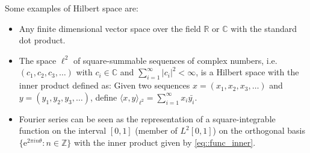 Some examples of Hilbert space are:

\begin{itemize}
  \item Any finite dimensional vector space over the field $\mathbb{R}$ or
  $\mathbb{C}$ with the standard dot product.
  \item The space $\ell^2$ of square-summable sequences of complex numbers, i.e.
  $(c_1,c_2,c_3,\ldots)$ with $c_i \in \mathbb{C}$ and $\sum_{i=1}^\infty |c_i|^2 <
  \infty$, is a Hilbert space with the inner product defined as: Given two
  sequences $x=(x_1,x_2,x_3,\ldots)$ and $y=(y_1,y_2,y_3,\ldots)$, define $\langle x,y
  \rangle_{\scriptscriptstyle \ell^2} = \sum_{i=1}^\infty x_i \bar{y_i}$.
  \item Fourier series can be seen as the representation of a square-integrable
  function on the interval $[0,1]$ (member of $L^2[0,1]$) on the orthogonal
  basis $\{\mathrm{e}^{2\pi i n \theta} : n \in \mathbb{Z}\}$ with the
  inner product given by \ref{eq::func_inner}.
\end{itemize}

